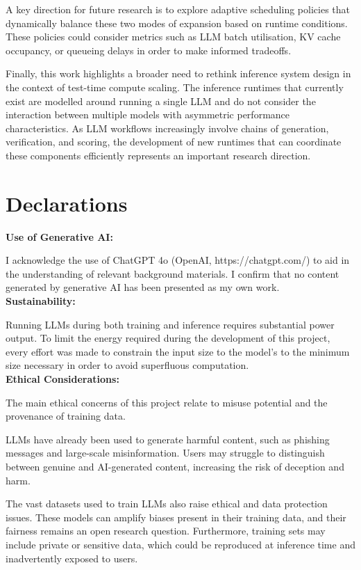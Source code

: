 \documentclass[11pt,twoside]{report}
\begin{document}
A key direction for future research is to explore adaptive scheduling policies that dynamically balance these two modes of expansion based on runtime conditions.
These policies could consider metrics such as LLM batch utilisation, KV cache occupancy, or queueing delays in order to make informed tradeoffs.

Finally, this work highlights a broader need to rethink inference system design in the context of test-time compute scaling.
The inference runtimes that currently exist are modelled around running a single LLM and do not consider the interaction between multiple models with asymmetric performance characteristics.
As LLM workflows increasingly involve chains of generation, verification, and scoring, the development of new runtimes that can coordinate these components efficiently represents an important research direction.




\chapter{Declarations}
\textbf{Use of Generative AI:} 

I acknowledge the use of ChatGPT 4o (OpenAI, https://chatgpt.com/) to aid in the understanding of relevant background materials. 
I confirm that no content generated by generative AI has been presented as my own work. \\

\textbf{Sustainability:} 

Running LLMs during both training and inference requires substantial power output.
To limit the energy required during the development of this project, every effort was made to constrain the input size to the model's to the minimum size necessary in order to avoid superfluous computation. \\

\textbf{Ethical Considerations:}

The main ethical concerns of this project relate to misuse potential and the provenance of training data.

LLMs have already been used to generate harmful content, such as phishing messages and large-scale misinformation. 
Users may struggle to distinguish between genuine and AI-generated content, increasing the risk of deception and harm.

The vast datasets used to train LLMs also raise ethical and data protection issues. 
These models can amplify biases present in their training data, and their fairness remains an open research question. 
Furthermore, training sets may include private or sensitive data, which could be reproduced at inference time and inadvertently exposed to users.
\end{document}
